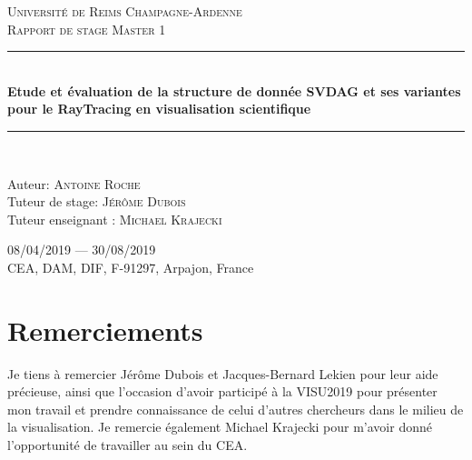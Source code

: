 \documentclass[12pt,a4paper,twoside]{article}
\newcommand{\HRule}{\rule{\linewidth}{0.5mm}}
\begin{document}
\begin{titlepage}
\begin{sffamily}
\begin{center}
\begin{figure}[h]
\begin{minipage}[c]{.46\linewidth}
                    \end{minipage}
                \end{figure}
                \vspace{2cm}
                \textsc{\LARGE Université de Reims Champagne-Ardenne}\\[2cm]
                \textsc{\Large Rapport de stage Master 1}\\[1.5cm]
                \HRule \\[1cm]
                { \Large \bfseries Etude et évaluation de la structure de donnée SVDAG et ses variantes pour le RayTracing en visualisation scientifique \\[0.4cm] }
                \HRule \\[2cm]


                \begin{minipage}{0.8\textwidth}
                    \begin{flushleft}
                        \Large Auteur: \textsc{Antoine Roche}\\
                        Tuteur de stage: \textsc{Jérôme Dubois}\\
                        Tuteur enseignant : \textsc{Michael Krajecki}\\
                    \end{flushleft}
                \end{minipage}

                \vfill
                \Large 08/04/2019 — 30/08/2019 \\[1cm]
                \Huge {CEA, DAM, DIF, F-91297, Arpajon, France}

            \end{center}
        \end{sffamily}
    \end{titlepage}

    \newpage
    \section*{Remerciements}

    Je tiens à remercier Jérôme Dubois et Jacques-Bernard Lekien pour leur aide précieuse, ainsi que l'occasion d'avoir participé
    à la VISU2019 pour présenter mon travail et prendre connaissance de celui d'autres chercheurs dans le milieu de la visualisation.
    Je remercie également Michael Krajecki pour m'avoir donné l'opportunité de travailler au sein du CEA.
\end{document}
